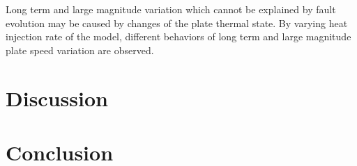 \documentclass[letterpaper,12pt,notitle]{memphisthesis}                     %
\begin{document}
Long term and large magnitude variation which cannot be explained by fault evolution may be caused by changes of the plate thermal state. By varying heat injection rate of the model, different behaviors of long term and large magnitude plate speed variation are observed. 


\chapter{Discussion}

\chapter{Conclusion}

\end{document}
